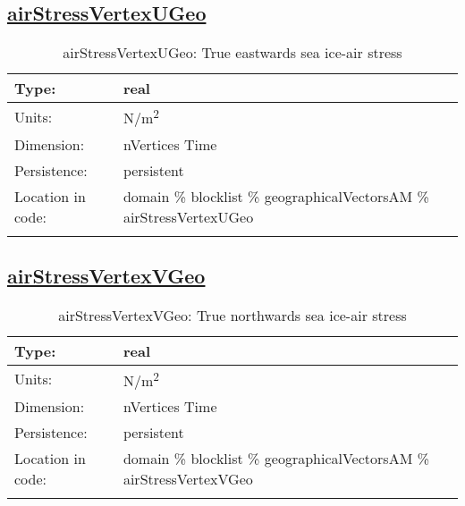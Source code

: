 \subsection[airStressVertexUGeo]{\hyperref[sec:var_tab_geographicalVectorsAM]{airStressVertexUGeo}}
\label{subsec:var_sec_geographicalVectorsAM_airStressVertexUGeo}
\begin{center}
\begin{longtable}{| p{2.0in} | p{4.0in} |}
        \hline 
        Type: & real \\
        \hline 
        Units: & \si{N/m^2} \\
        \hline 
        Dimension: & nVertices Time \\
        \hline 
        Persistence: & persistent \\
        \hline 
         Location in code: & domain \% blocklist \% geographicalVectorsAM \% airStressVertexUGeo \\
         \hline 
    \caption{airStressVertexUGeo: True eastwards sea ice-air stress}
\end{longtable}
\end{center}
\subsection[airStressVertexVGeo]{\hyperref[sec:var_tab_geographicalVectorsAM]{airStressVertexVGeo}}
\label{subsec:var_sec_geographicalVectorsAM_airStressVertexVGeo}
\begin{center}
\begin{longtable}{| p{2.0in} | p{4.0in} |}
        \hline 
        Type: & real \\
        \hline 
        Units: & \si{N/m^2} \\
        \hline 
        Dimension: & nVertices Time \\
        \hline 
        Persistence: & persistent \\
        \hline 
         Location in code: & domain \% blocklist \% geographicalVectorsAM \% airStressVertexVGeo \\
         \hline 
    \caption{airStressVertexVGeo: True northwards sea ice-air stress}
\end{longtable}
\end{center}
